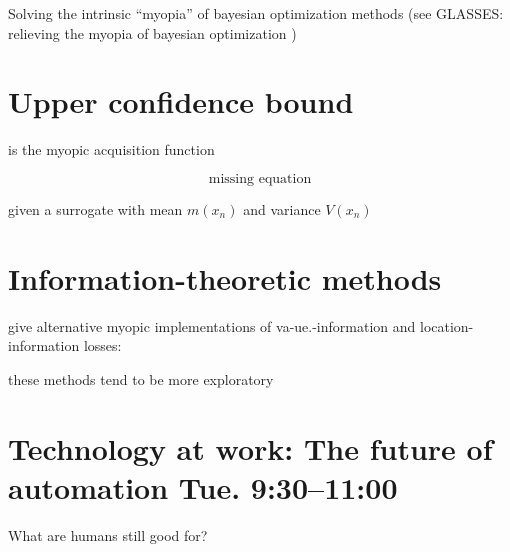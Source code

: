 Solving the intrinsic ``myopia'' of bayesian optimization methods (see GLASSES:
relieving the myopia of bayesian optimization \cite{gonzalez2016glasses})


\section{Upper confidence bound}

is the myopic acquisition function


\begin{equation}
  \text{missing equation}
\end{equation}

given a surrogate with mean $m(x_n)$ and variance $V(x_n)$


\section{Information-theoretic methods}

give alternative myopic implementations of va-ue.-information and
location-information losses:


these methods tend to be more exploratory

\section{Technology at work: The future of automation Tue. 9:30--11:00}


What are humans still good for?
